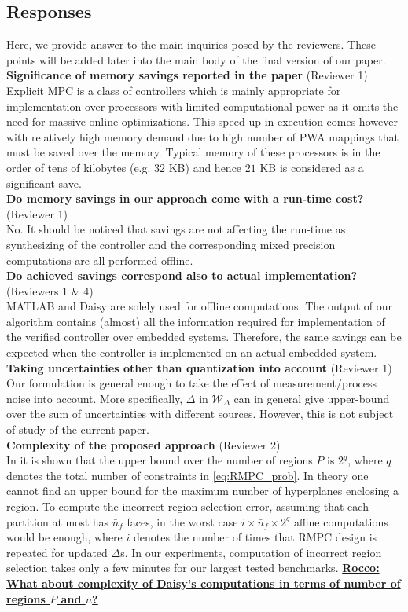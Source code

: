 {\subsection{Responses}
Here, we provide answer to the main inquiries posed by the reviewers. These points will be added later into the main body of the final version of our paper.\\
\textbf{Significance of memory savings reported in the paper} (Reviewer 1)\\
Explicit MPC is a class of controllers which is mainly appropriate for implementation over processors with limited computational power as it omits the need for massive online optimizations. This speed up in execution comes however with relatively high memory demand due to high number of PWA mappings that must be saved over the memory. Typical memory of these processors is in the order of tens of kilobytes (e.g. $32$ KB) and hence $21$ KB is considered as a significant save.\\ 
\textbf{Do memory savings in our approach come with a run-time cost?} (Reviewer 1)
\\
No. It should be noticed that savings are not affecting the run-time as synthesizing of the controller and the corresponding mixed precision computations are all performed offline.\\
\textbf{Do achieved savings correspond also to actual implementation?} (Reviewers 1 $\&$ 4)\\
MATLAB and Daisy are solely used for offline computations. The output of our algorithm contains (almost) all the information required for implementation of the verified controller over embedded systems. Therefore, the same savings can be expected when the controller is implemented on an actual embedded system.\\
\textbf{Taking uncertainties other than quantization into account} (Reviewer 1)\\
Our formulation is general enough to take the effect of measurement/process noise into account. More specifically, $\Delta$ in $\mathcal{W}_{\Delta}$ can in general give upper-bound over the sum of uncertainties with different sources. However, this is not subject of study of the current paper.\\
\textbf{Complexity of the proposed approach} (Reviewer 2)\\
In \cite{Alessio2009} it is shown that the upper bound over the number of regions $P$ is $2^q$, where $q$ denotes the total number of constraints in \autoref{eq:RMPC_prob}. In theory one cannot find an upper bound for the maximum number of hyperplanes enclosing a region. To compute the incorrect region selection error, assuming that each partition at most has $\bar n_f$ faces, in the worst case $i\times\bar n_f\times 2^q$ affine computations would be enough, where $i$ denotes the number of times that RMPC design is repeated for updated $\Delta$s. In our experiments, computation of incorrect region selection takes only a few minutes for our largest tested benchmarks. \underline{\textbf{Rocco: What about complexity of Daisy's computations in terms of number of regions $P$ and $n$?}}\\
}
